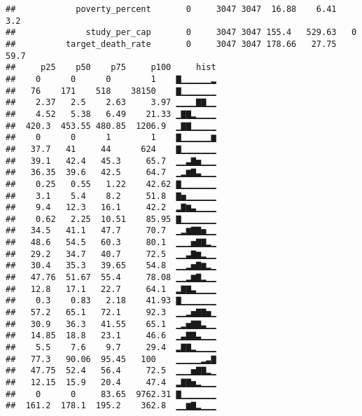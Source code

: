 \documentclass[]{article}
\newenvironment{Shaded}{\begin{snugshade}}{\end{snugshade}}
\newcommand{\KeywordTok}[1]{\textcolor[rgb]{0.13,0.29,0.53}{\textbf{#1}}}
\newcommand{\StringTok}[1]{\textcolor[rgb]{0.31,0.60,0.02}{#1}}
\newcommand{\CommentTok}[1]{\textcolor[rgb]{0.56,0.35,0.01}{\textit{#1}}}
\newcommand{\OperatorTok}[1]{\textcolor[rgb]{0.81,0.36,0.00}{\textbf{#1}}}
\newcommand{\NormalTok}[1]{#1}
\begin{document}
\begin{verbatim}
##            poverty_percent       0     3047 3047  16.88    6.41   3.2  
##              study_per_cap       0     3047 3047 155.4   529.63   0    
##          target_death_rate       0     3047 3047 178.66   27.75  59.7  
##     p25    p50    p75     p100     hist
##    0      0      0        1    ▇▁▁▁▁▁▁▂
##   76    171    518    38150    ▇▁▁▁▁▁▁▁
##    2.37   2.5    2.63     3.97 ▁▁▁▁▇▇▁▁
##    4.52   5.38   6.49    21.33 ▁▇▇▂▁▁▁▁
##  420.3  453.55 480.85  1206.9  ▁▇▇▁▁▁▁▁
##    0      0      1        1    ▇▁▁▁▁▁▁▆
##   37.7   41     44      624    ▇▁▁▁▁▁▁▁
##   39.1   42.4   45.3     65.7  ▁▁▃▇▅▁▁▁
##   36.35  39.6   42.5     64.7  ▁▂▆▇▃▁▁▁
##    0.25   0.55   1.22    42.62 ▇▁▁▁▁▁▁▁
##    3.1    5.4    8.2     51.8  ▇▅▁▁▁▁▁▁
##    9.4   12.3   16.1     42.2  ▂▇▆▃▁▁▁▁
##    0.62   2.25  10.51    85.95 ▇▁▁▁▁▁▁▁
##   34.5   41.1   47.7     70.7  ▁▂▆▇▇▅▁▁
##   48.6   54.5   60.3     80.1  ▁▁▁▅▇▇▂▁
##   29.2   34.7   40.7     72.5  ▁▁▃▇▆▂▁▁
##   30.4   35.3   39.65    54.8  ▁▁▂▅▇▆▂▁
##   47.76  51.67  55.4     78.08 ▁▁▂▆▇▂▁▁
##   12.8   17.1   22.7     64.1  ▂▇▇▃▁▁▁▁
##    0.3    0.83   2.18    41.93 ▇▁▁▁▁▁▁▁
##   57.2   65.1   72.1     92.3  ▁▁▂▅▇▇▅▁
##   30.9   36.3   41.55    65.1  ▁▂▅▇▇▃▁▁
##   14.85  18.8   23.1     46.6  ▁▃▇▇▃▁▁▁
##    5.5    7.6    9.7     29.4  ▂▇▇▂▁▁▁▁
##   77.3   90.06  95.45   100    ▁▁▁▁▁▂▃▇
##   47.75  52.4   56.4     72.5  ▁▁▁▅▇▇▂▁
##   12.15  15.9   20.4     47.4  ▂▇▇▅▂▁▁▁
##    0      0     83.65  9762.31 ▇▁▁▁▁▁▁▁
##  161.2  178.1  195.2    362.8  ▁▁▆▇▂▁▁▁
\end{verbatim}

\begin{Shaded}
\end{Shaded}
\end{document}
